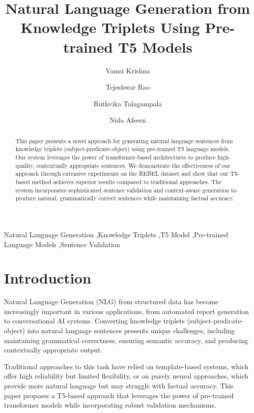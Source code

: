 \documentclass[3p,times,procedia]{elsarticle}
\begin{document}
\begin{frontmatter}

\title{Natural Language Generation from Knowledge Triplets Using Pre-trained T5 Models}

\author[label1]{Vamsi Krishna}
\author[label1]{Tejeshwar Rao}
\author[label1]{Ruthvika Talagampala}
\author[label1]{Nida Afseen}

\address[label1]{PDPM Indian Institute of Information Technology, Design and Manufacturing, Jabalpur, M.P., India}

\begin{abstract}
This paper presents a novel approach for generating natural language sentences from knowledge triplets (subject-predicate-object) using pre-trained T5 language models. Our system leverages the power of transformer-based architectures to produce high-quality, contextually appropriate sentences. We demonstrate the effectiveness of our approach through extensive experiments on the REBEL dataset and show that our T5-based method achieves superior results compared to traditional approaches. The system incorporates sophisticated sentence validation and context-aware generation to produce natural, grammatically correct sentences while maintaining factual accuracy.
\end{abstract}

\begin{keyword}
Natural Language Generation \sep Knowledge Triplets \sep T5 Model \sep Pre-trained Language Models \sep Sentence Validation
\end{keyword}

\end{frontmatter}

\section{Introduction}
Natural Language Generation (NLG) from structured data has become increasingly important in various applications, from automated report generation to conversational AI systems. Converting knowledge triplets (subject-predicate-object) into natural language sentences presents unique challenges, including maintaining grammatical correctness, ensuring semantic accuracy, and producing contextually appropriate output.

Traditional approaches to this task have relied on template-based systems, which offer high reliability but limited flexibility, or on purely neural approaches, which provide more natural language but may struggle with factual accuracy. This paper proposes a T5-based approach that leverages the power of pre-trained transformer models while incorporating robust validation mechanisms.
\end{document}
